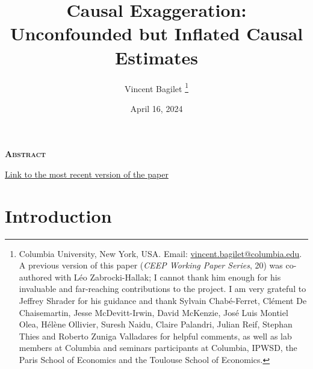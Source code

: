 \documentclass[usletter, 12pt]{article}
\begin{document}

	
	\title{Causal Exaggeration: \\ Unconfounded but Inflated Causal Estimates}

	\author{Vincent Bagilet
		\thanks{Columbia University, New York, USA. Email: \url{vincent.bagilet@columbia.edu}. 
			A previous version of this paper (\textit{CEEP Working Paper Series}, 20) was co-authored with Léo Zabrocki-Hallak; I cannot thank him enough for his invaluable and far-reaching contributions to the project. I am very grateful to Jeffrey Shrader for his guidance and thank Sylvain Chabé-Ferret, Clément De Chaisemartin, Jesse McDevitt-Irwin, David McKenzie, José Luis Montiel Olea, Hélène Ollivier, Suresh Naidu, Claire Palandri, Julian Reif, Stephan Thies and Roberto Zuniga Valladares for helpful comments, as well as lab members at Columbia and seminars participants at Columbia, IPWSD, the Paris School of Economics and the Toulouse School of Economics.}
	}
	

	\date{April 16, 2024}
	
	\maketitle
	
	\begin{center}
		\large \textsc{\textbf{Abstract}}\\
	\end{center}
	
	
		
			
	\begin{center}
		\href{https://vincentbagilet.github.io/causal_exaggeration/causal_exaggeration_paper.pdf}{Link to the most recent version of the paper}
	\end{center}
	
	
	\newpage
	


	
	\section{Introduction}
	
\end{document}
